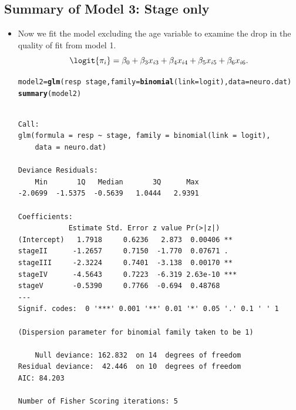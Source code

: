 \documentclass{article}\usepackage[]{graphicx}\usepackage[svgnames]{xcolor}
\makeatletter
\newcommand{\hlopt}[1]{\textcolor[rgb]{0,0,0}{#1}}%
\newcommand{\hlstd}[1]{\textcolor[rgb]{0.345,0.345,0.345}{#1}}%
\newcommand{\hlkwb}[1]{\textcolor[rgb]{0.69,0.353,0.396}{#1}}%
\newcommand{\hlkwc}[1]{\textcolor[rgb]{0.333,0.667,0.333}{#1}}%
\newcommand{\hlkwd}[1]{\textcolor[rgb]{0.737,0.353,0.396}{\textbf{#1}}}%
\newenvironment{kframe}{%
 \def\at@end@of@kframe{}%
 \ifinner\ifhmode%
  \def\at@end@of@kframe{\end{minipage}}%
  \begin{minipage}{\columnwidth}%
 \fi\fi%
 \def\FrameCommand##1{\hskip\@totalleftmargin \hskip-\fboxsep
 \colorbox{shadecolor}{##1}\hskip-\fboxsep
     \hskip-\linewidth \hskip-\@totalleftmargin \hskip\columnwidth}%
 \MakeFramed {\advance\hsize-\width
   \@totalleftmargin\z@ \linewidth\hsize
   \@setminipage}}%
 {\par\unskip\endMakeFramed%
 \at@end@of@kframe}
\newenvironment{knitrout}{}{} %
\makeatother
\begin{document}
\subsection*{Summary of Model 3: Stage only}
\begin{itemize}
    \item Now we fit the model excluding the age variable to examine the drop in the
          quality of fit from model 1.
          \[ \logit{\pi_i}=\beta_0+\beta_3x_{i3}+\beta_4x_{i4}+\beta_5x_{i5}+\beta_6x_{i6}. \]
\begin{knitrout}
\color{fgcolor}\begin{kframe}
\begin{alltt}
\hlstd{model2} \hlkwb{=} \hlkwd{glm}\hlstd{(resp} \hlopt{~} \hlstd{stage,} \hlkwc{family} \hlstd{=} \hlkwd{binomial}\hlstd{(}\hlkwc{link} \hlstd{= logit),} \hlkwc{data} \hlstd{= neuro.dat)}
\hlkwd{summary}\hlstd{(model2)}
\end{alltt}
\begin{verbatim}

Call:
glm(formula = resp ~ stage, family = binomial(link = logit), 
    data = neuro.dat)

Deviance Residuals: 
    Min       1Q   Median       3Q      Max  
-2.0699  -1.5375  -0.5639   1.0444   2.9391  

Coefficients:
            Estimate Std. Error z value Pr(>|z|)    
(Intercept)   1.7918     0.6236   2.873  0.00406 ** 
stageII      -1.2657     0.7150  -1.770  0.07671 .  
stageIII     -2.3224     0.7401  -3.138  0.00170 ** 
stageIV      -4.5643     0.7223  -6.319 2.63e-10 ***
stageV       -0.5390     0.7766  -0.694  0.48768    
---
Signif. codes:  0 '***' 0.001 '**' 0.01 '*' 0.05 '.' 0.1 ' ' 1

(Dispersion parameter for binomial family taken to be 1)

    Null deviance: 162.832  on 14  degrees of freedom
Residual deviance:  42.446  on 10  degrees of freedom
AIC: 84.203

Number of Fisher Scoring iterations: 5
\end{verbatim}
\end{kframe}
\end{knitrout}
\end{itemize}
\end{document}
